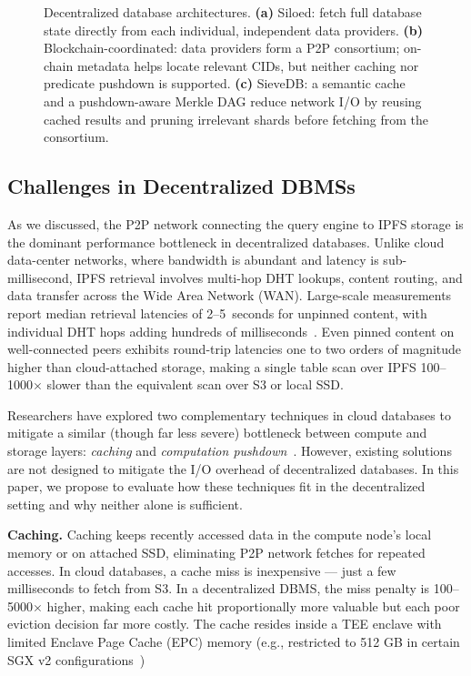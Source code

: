 \begin{figure}[t]
\begin{tikzpicture}
    \end{tikzpicture}
    \caption{Decentralized database architectures.
    \textbf{(a)} Siloed: fetch full database state directly from each individual, independent data providers.
    \textbf{(b)} Blockchain-coordinated: data providers form a P2P consortium; on-chain metadata helps locate relevant CIDs, but neither caching nor predicate pushdown is supported.
    \textbf{(c)} SieveDB: a semantic cache and a pushdown-aware Merkle DAG reduce network I/O by reusing cached results and pruning irrelevant shards before fetching from the consortium.}
    \label{fig:arch}
\end{figure}
 
 
\subsection{Challenges in Decentralized DBMSs}
\label{sec:bg_challenges}
 
As we discussed, the P2P network connecting the query engine to IPFS storage is the dominant performance bottleneck in decentralized databases. Unlike cloud data-center networks, where bandwidth is abundant and latency is sub-millisecond, IPFS retrieval involves multi-hop DHT lookups, content routing, and data transfer across the Wide Area Network (WAN). Large-scale measurements report median retrieval latencies of 2--5~seconds for unpinned content, with individual DHT hops adding hundreds of milliseconds~\cite{trautwein2022design, henningsen2020mapping, daniel2022ipfs}. Even pinned content on well-connected peers exhibits round-trip latencies one to two orders of magnitude higher than cloud-attached storage, making a single table scan over IPFS 100--1000$\times$ slower than the equivalent scan over S3 or local SSD.
 
Researchers have explored two complementary techniques in cloud databases to mitigate a similar (though far less severe) bottleneck between compute and storage layers: \emph{caching} and \emph{computation pushdown}~\cite{yang2021flexpushdowndb}. However, existing solutions are not designed to mitigate the I/O overhead of decentralized databases. In this paper, we propose \ours{} to evaluate how these techniques fit in the decentralized setting and why neither alone is sufficient.
 
\textbf{Caching.}
Caching keeps recently accessed data in the compute node's local memory or on attached SSD, eliminating P2P network fetches for repeated accesses. In cloud databases, a cache miss is inexpensive — just a few milliseconds to fetch from S3. In a decentralized DBMS, the miss penalty is 100--5000$\times$ higher, making each cache hit proportionally more valuable but each poor eviction decision far more costly. The cache resides inside a TEE enclave with limited Enclave Page Cache (EPC) memory (e.g., restricted to 512 GB in certain SGX v2 configurations~\cite{costan2016intel, lutsch2024benchmarking})
 
